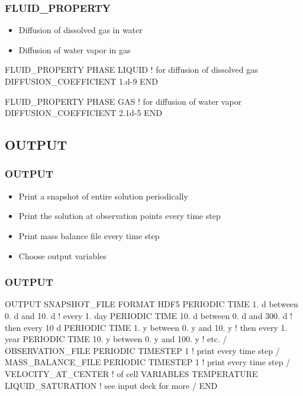\documentclass{beamer}
\newcommand\bluecomment[1]{{{\color{blue} #1}}}
\begin{document}
\begin{frame}[fragile]\frametitle{FLUID\_PROPERTY}
\begin{itemize}
  \item Diffusion of dissolved gas in water
  \item Diffusion of water vapor in gas
\end{itemize}

\begin{semiverbatim}

FLUID_PROPERTY
  PHASE LIQUID \bluecomment{! for diffusion of dissolved gas}
  DIFFUSION_COEFFICIENT 1.d-9
END

FLUID_PROPERTY
  PHASE GAS \bluecomment{! for diffusion of water vapor}
  DIFFUSION_COEFFICIENT 2.1d-5
END
\end{semiverbatim}

\end{frame}

\subsection{OUTPUT}

\begin{frame}[fragile]\frametitle{OUTPUT}
\begin{itemize}
  \item Print a snapshot of entire solution periodically
  \item Print the solution at observation points every time step
  \item Print mass balance file every time step
  \item Choose output variables
\end{itemize}

\end{frame}

\begin{frame}[fragile]\frametitle{OUTPUT}

\begin{semiverbatim}\small
OUTPUT
  SNAPSHOT_FILE
    FORMAT HDF5
    PERIODIC TIME 1. d between 0. d and 10. d  \bluecomment{! every 1. day}
    PERIODIC TIME 10. d between 0. d and 300. d  \bluecomment{! then every 10 d}
    PERIODIC TIME 1. y between 0. y and 10. y \bluecomment{! then every 1. year}
    PERIODIC TIME 10. y between 0. y and 100. y \bluecomment{! etc.}
  /
  OBSERVATION_FILE
    PERIODIC TIMESTEP 1 \bluecomment{! print every time step}
  /
  MASS_BALANCE_FILE
    PERIODIC TIMESTEP 1 \bluecomment{! print every time step}
  /
  VELOCITY_AT_CENTER \bluecomment{! of cell}
  VARIABLES
    TEMPERATURE
    LIQUID_SATURATION \bluecomment{! see input deck for more}
  /
END
\end{semiverbatim}

\end{frame}
\end{document}
